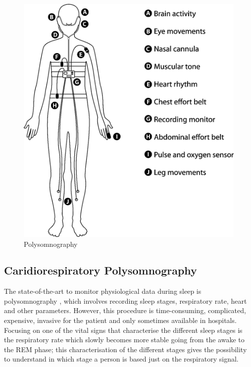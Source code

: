 \begin{figure}[p]
    \centering
    \includegraphics[width=\textwidth]{img/PSG test.png}
    \caption{Polysomnography}
    \label{fig:PSGComplete}
\end{figure}

\subsection{Caridiorespiratory Polysomnography} \label{cap:cardiorespiratory}
The state-of-the-art to monitor physiological data during sleep is polysomnography \cite{Penzel2016ModulationsPolysomnography}
, which involves recording sleep stages, respiratory rate, heart and other parameters. However, this procedure is time-consuming, 
complicated, expensive, invasive for the patient and only sometimes available in hospitals. 
Focusing on one of the vital signs that characterise the different sleep stages is the respiratory rate 
which slowly becomes more stable going from the awake to the REM phase; this characterisation of the different stages gives the possibility to 
understand in which stage a person is based just on the respiratory signal. \\

